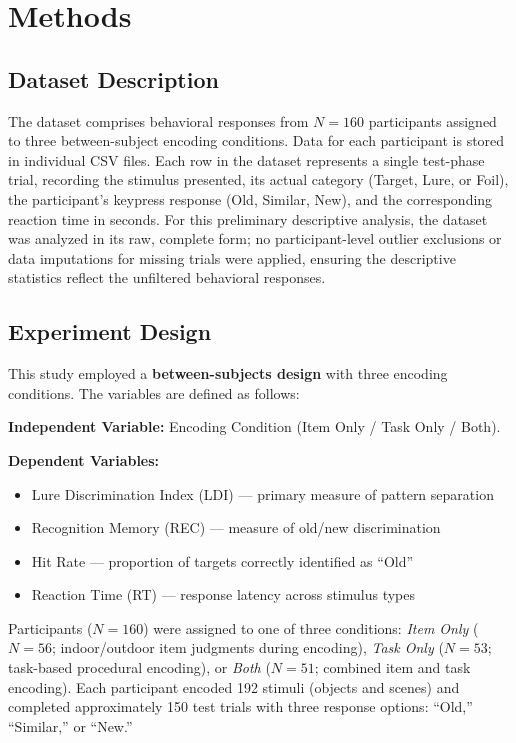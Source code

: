 \documentclass[12pt]{article}
\begin{document}
\section{Methods}

\subsection{Dataset Description}

The dataset comprises behavioral responses from $N = 160$ participants assigned to three between-subject encoding conditions. Data for each participant is stored in individual CSV files. Each row in the dataset represents a single test-phase trial, recording the stimulus presented, its actual category (Target, Lure, or Foil), the participant's keypress response (Old, Similar, New), and the corresponding reaction time in seconds. For this preliminary descriptive analysis, the dataset was analyzed in its raw, complete form; no participant-level outlier exclusions or data imputations for missing trials were applied, ensuring the descriptive statistics reflect the unfiltered behavioral responses.

\subsection{Experiment Design}

This study employed a \textbf{between-subjects design} with three encoding conditions. The variables are defined as follows:

\textbf{Independent Variable:} Encoding Condition (Item Only / Task Only / Both).

\textbf{Dependent Variables:}
\begin{itemize}[nosep, leftmargin=1.5em]
    \item Lure Discrimination Index (LDI) --- primary measure of pattern separation
    \item Recognition Memory (REC) --- measure of old/new discrimination
    \item Hit Rate --- proportion of targets correctly identified as ``Old''
    \item Reaction Time (RT) --- response latency across stimulus types
\end{itemize}

Participants ($N = 160$) were assigned to one of three conditions: \textit{Item Only} ($N = 56$; indoor/outdoor item judgments during encoding), \textit{Task Only} ($N = 53$; task-based procedural encoding), or \textit{Both} ($N = 51$; combined item and task encoding). Each participant encoded 192 stimuli (objects and scenes) and completed approximately 150 test trials with three response options: ``Old,'' ``Similar,'' or ``New.''
\end{document}
